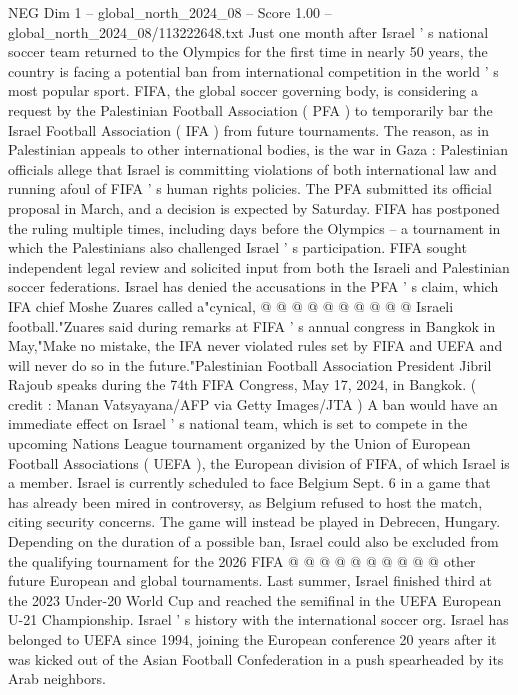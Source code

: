 \begin{textsample}{NEG Dim 1 – global\_north\_2024\_08 – Score 1.00 – global\_north\_2024\_08/113222648.txt}  \label{ex:f1_neg_044}
Just one month after Israel ' s national soccer team returned to the Olympics for the first time in nearly 50 years, the country is facing a potential ban from international competition in the world ' s most popular sport.
FIFA, the global soccer governing body, is considering a request by the Palestinian Football Association ( PFA ) to temporarily bar the Israel Football Association ( IFA ) from future tournaments.
The reason, as in Palestinian appeals to other international bodies, is the war in Gaza : Palestinian officials allege that Israel is committing violations of both international law and running afoul of FIFA ' s human rights policies.
The PFA submitted its official proposal in March, and a decision is expected by Saturday.
FIFA has postponed the ruling multiple times, including days before the Olympics -- a tournament in which the Palestinians also challenged Israel ' s participation.
FIFA sought independent legal review and solicited input from both the Israeli and Palestinian soccer federations.
Israel has denied the accusations in the PFA ' s claim, which IFA chief Moshe Zuares called a"cynical, @ @ @ @ @ @ @ @ @ @ Israeli football."Zuares said during remarks at FIFA ' s annual congress in Bangkok in May,"Make no mistake, the IFA never violated rules set by FIFA and UEFA and will never do so in the future."Palestinian Football Association President Jibril Rajoub speaks during the 74th FIFA Congress, May 17, 2024, in Bangkok. ( credit : Manan Vatsyayana/AFP via Getty Images/JTA ) A ban would have an immediate effect on Israel ' s national team, which is set to compete in the upcoming Nations League tournament organized by the Union of European Football Associations ( UEFA ), the European division of FIFA, of which Israel is a member.
Israel is currently scheduled to face Belgium Sept. 6 in a game that has already been mired in controversy, as Belgium refused to host the match, citing security concerns.
The game will instead be played in Debrecen, Hungary.
Depending on the duration of a possible ban, Israel could also be excluded from the qualifying tournament for the 2026 FIFA @ @ @ @ @ @ @ @ @ @ other future European and global tournaments.
Last summer, Israel finished third at the 2023 Under-20 World Cup and reached the semifinal in the UEFA European U-21 Championship.
Israel ' s history with the international soccer org.
Israel has belonged to UEFA since 1994, joining the European conference 20 years after it was kicked out of the Asian Football Confederation in a push spearheaded by its Arab neighbors.

\end{textsample}

